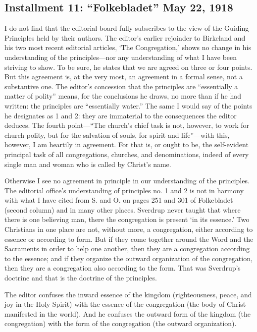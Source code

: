 



\subsection{Installment 11: “Folkebladet” May 22, 1918}

I do not find that the editorial board fully subscribes to the view of the Guiding Principles held by their authors. The editor’s earlier rejoinder to Birkeland and his two most recent editorial articles, ‘The Congregation,’ shows no change in his understanding of the principles—nor any understanding of what I have been striving to show. To be sure, he states that we are agreed on three or four points. But this agreement is, at the very most, an agreement in a formal sense, not a substantive one. The editor’s concession that the principles are “essentially a matter of polity” means, for the conclusions he draws, no more than if he had written: the principles are “essentially water.” The same I would say of the points he designates as 1 and 2: they are immaterial to the consequences the editor deduces. The fourth point—“The church’s chief task is not, however, to work for church polity, but for the salvation of souls, for spirit and life”—with this, however, I am heartily in agreement. For that is, or ought to be, the self-evident principal task of all congregations, churches, and denominations, indeed of every single man and woman who is called by Christ’s name.

Otherwise I see no agreement in principle in our understanding of the principles. The editorial office’s understanding of principles no. 1 and 2 is not in harmony with what I have cited from S. and O. on pages 251 and 301 of Folkebladet (second column) and in many other places. Sverdrup never taught that where there is one believing man, there the congregation is present ‘in its essence.’ Two Christians in one place are not, without more, a congregation, either according to essence or according to form. But if they come together around the Word and the Sacraments in order to help one another, then they are a congregation according to the essence; and if they organize the outward organization of the congregation, then they are a congregation also according to the form. That was Sverdrup’s doctrine and that is the doctrine of the principles.

The editor confuses the inward essence of the kingdom (righteousness, peace, and joy in the Holy Spirit) with the essence of the congregation (the body of Christ manifested in the world). And he confuses the outward form of the kingdom (the congregation) with the form of the congregation (the outward organization).

